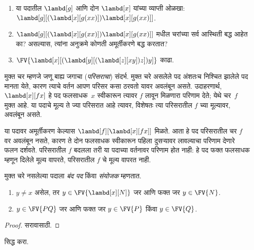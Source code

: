 \documentclass[../../../include/open-logic-section]{subfiles}
\begin{document}
\begin{prob}
  \begin{enumerate}
  \item या पदातील $\lambd[g]$ आणि दोन $\lambd[x]$ यांच्या
    व्याप्ती ओळखा: $\lambd[g][(\lambd[x][g (x x)]) \lambd[x][g (x x)]]$.
  \item $\lambd[g][(\lambd[x][g (x x)]) \lambd[x][g (x x)]]$
    मधील चरांच्या सर्व आस्थिती बद्ध आहेत का? असल्यास,
    त्यांना अनुक्रमे कोणती अमूर्तीकरणे बद्ध करतात?
    \item $\FV{\lambd[x][(\lambd[y][(\lambd[z][x y]) z]) y]}$
      काढा.
  \end{enumerate}
\end{prob}

\begin{explain}
मुक्त चर म्हणजे जणू बाह्य जगाचा (\emph{परिसराचा}) संदर्भ.
मुक्त चरे असलेले पद अंशतःच निश्चित झालेले पद मानता येते,
कारण त्याचे वर्तन आपण परिसर कसा ठरवतो यावर अवलंबून असते.
उदाहरणार्थ, $\lambd[x][f x]$ हे पद फलसाधक~$x$ स्वीकारून
त्यावर $f$ लावून मिळणारा परिणाम देते; येथे चर~$f$ मुक्त आहे.
या पदाचे मूल्य ते ज्या परिसरात आहे त्यावर, विशेषतः त्या
परिसरातील $f$ च्या मूल्यावर, अवलंबून असते.

या पदावर अमूर्तीकरण केल्यास $\lambd[f][\lambd[x][f
    x]]$ मिळते. आता हे पद परिसरातील चर $f$ वर अवलंबून
नसते, कारण ते दोन फलसाधक स्वीकारून पहिला दुसऱ्यावर
लावल्याचा परिणाम देणारे फलन दर्शवते. परिसरातील $f$
बदलला तरी या पदाच्या वर्तनावर परिणाम होत नाही: हे पद
फक्त फलसाधक म्हणून दिलेले मूल्य वापरते, परिसरातील
$f$ चे मूल्य वापरत नाही.
\end{explain}

\begin{defn}[बंद पद, संयोजक]
  मुक्त चरे नसलेल्या पदाला \emph{बंद पद} किंवा
  \emph{संयोजक} म्हणतात.
\end{defn}

\begin{lem}
  \begin{enumerate}
    \item {} $y \neq x$ असेल, तर $y \in
      \FV{\lambd[x][N]}$ जर आणि फक्त जर $y \in \FV{N}$.
    \item {} $y \in \FV{PQ}$ जर आणि
      फक्त जर $y \in \FV{P}$ किंवा $y
      \in \FV{Q}$.
    \end{enumerate}
\end{lem}

\begin{proof}
  सरावासाठी.
\end{proof}

\begin{prob}
   सिद्ध करा.
\end{prob}
\end{document}
